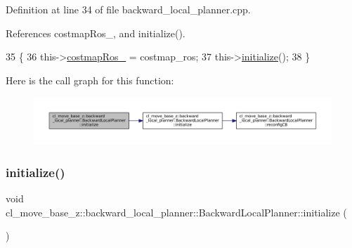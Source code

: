 Definition at line 34 of file backward\+\_\+local\+\_\+planner.\+cpp.



References costmap\+Ros\+\_\+, and initialize().


\begin{DoxyCode}
35         \{
36             this->\hyperlink{classcl__move__base__z_1_1backward__local__planner_1_1BackwardLocalPlanner_a4136268882a105d9e06e173d85d5c0dc}{costmapRos\_} = costmap\_ros;
37             this->\hyperlink{classcl__move__base__z_1_1backward__local__planner_1_1BackwardLocalPlanner_a5c9815019cef272faed835cd8c575196}{initialize}();
38         \}
\end{DoxyCode}
Here is the call graph for this function\+:
\nopagebreak
\begin{figure}[H]
\begin{center}
\leavevmode
\includegraphics[width=350pt]{classcl__move__base__z_1_1backward__local__planner_1_1BackwardLocalPlanner_a9a854ad7d93c5db2efda316358aa845c_cgraph}
\end{center}
\end{figure}
\mbox{\label{classcl__move__base__z_1_1backward__local__planner_1_1BackwardLocalPlanner_a5c9815019cef272faed835cd8c575196}} 
\subsubsection{\texorpdfstring{initialize()}{initialize()}\hspace{0.1cm}{\footnotesize\ttfamily [3/3]}}
{\footnotesize\ttfamily void cl\+\_\+move\+\_\+base\+\_\+z\+::backward\+\_\+local\+\_\+planner\+::\+Backward\+Local\+Planner\+::initialize (\begin{DoxyParamCaption}{ }\end{DoxyParamCaption})}



